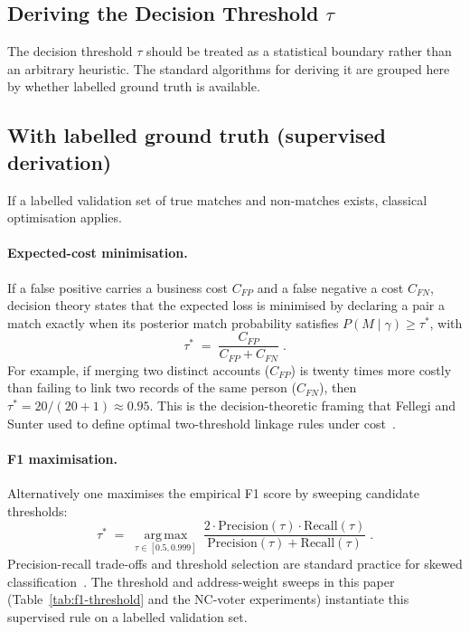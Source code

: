 \documentclass[conference]{IEEEtran}
\begin{document}
\begin{appendices}
\section{Deriving the Decision Threshold $\tau$}
\label{app:derive-tau}
The decision threshold $\tau$ should be treated as a statistical boundary rather than an arbitrary heuristic. The standard algorithms for deriving it are grouped here by whether labelled ground truth is available.

\subsection{With labelled ground truth (supervised derivation)}
If a labelled validation set of true matches and non-matches exists, classical optimisation applies.

\paragraph{Expected-cost minimisation.} If a false positive carries a business cost $C_{FP}$ and a false negative a cost $C_{FN}$, decision theory states that the expected loss is minimised by declaring a pair a match exactly when its posterior match probability satisfies $P(M\mid \gamma)\ge \tau^*$, with
\[
\tau^* \;=\; \frac{C_{FP}}{C_{FP}+C_{FN}}\;.
\]
For example, if merging two distinct accounts ($C_{FP}$) is twenty times more costly than failing to link two records of the same person ($C_{FN}$), then $\tau^* = 20/(20+1) \approx 0.95$. This is the decision-theoretic framing that Fellegi and Sunter used to define optimal two-threshold linkage rules under cost~\cite{fellegi1969,winkler1993}.

\paragraph{F1 maximisation.} Alternatively one maximises the empirical F1 score by sweeping candidate thresholds:
\[
\tau^* \;=\; \operatorname*{arg\,max}_{\tau\in[0.5,0.999]}\ \frac{2\cdot \mathrm{Precision}(\tau)\cdot \mathrm{Recall}(\tau)}
{\mathrm{Precision}(\tau)+\mathrm{Recall}(\tau)}\;.
\]
Precision-recall trade-offs and threshold selection are standard practice for skewed classification~\cite{davis2006,christen2012}. The threshold and address-weight sweeps in this paper (Table~\ref{tab:f1-threshold} and the NC-voter experiments) instantiate this supervised rule on a labelled validation set.


\end{appendices}
\end{document}
